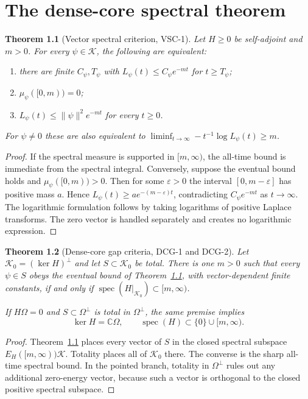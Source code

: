 \documentclass[11pt,oneside]{report}
\newtheorem{theorem}{Theorem}[chapter]
\theoremstyle{definition}
\theoremstyle{remark}
\newcommand{\spec}{\operatorname{spec}}
\begin{document}
\chapter{The dense-core spectral theorem}

\begin{theorem}[Vector spectral criterion, VSC-1]\label{thm:vsc}
Let $H\geq0$ be self-adjoint and $m>0$. For every $\psi\in\mathcal K$,
the following are equivalent:
\begin{enumerate}
\item there are finite $C_\psi,T_\psi$ with
$L_\psi(t)\leq C_\psi e^{-mt}$ for $t\geq T_\psi$;
\item $\mu_\psi([0,m))=0$;
\item $L_\psi(t)\leq\|\psi\|^2e^{-mt}$ for every $t\geq0$.
\end{enumerate}
For $\psi\neq0$ these are also equivalent to
$\liminf_{t\to\infty}-t^{-1}\log L_\psi(t)\geq m$.
\end{theorem}
\begin{proof}
If the spectral measure is supported in $[m,\infty)$, the all-time bound is
immediate from the spectral integral. Conversely, suppose the eventual bound
holds and $\mu_\psi([0,m))>0$. Then for some $\varepsilon>0$ the interval
$[0,m-\varepsilon]$ has positive mass $a$. Hence
$L_\psi(t)\geq a e^{-(m-\varepsilon)t}$, contradicting
$C_\psi e^{-mt}$ as $t\to\infty$. The logarithmic formulation follows by
taking logarithms of positive Laplace transforms. The zero vector is handled
separately and creates no logarithmic expression.
\end{proof}

\begin{theorem}[Dense-core gap criteria, DCG-1 and DCG-2]\label{thm:dcg}
Let $\mathcal K_0=(\ker H)^\perp$ and let $S\subset\mathcal K_0$ be total.
There is one $m>0$ such that every $\psi\in S$ obeys the eventual bound of
Theorem~\ref{thm:vsc}, with vector-dependent finite constants, if and only if
$\spec(H|_{\mathcal K_0})\subset[m,\infty)$.

If $H\Omega=0$ and $S\subset\Omega^\perp$ is total in $\Omega^\perp$, the
same premise implies
\[
 \ker H=\mathbb C\Omega,\qquad
 \spec(H)\subset\{0\}\cup[m,\infty).
\]
\end{theorem}
\begin{proof}
Theorem~\ref{thm:vsc} places every vector of $S$ in the closed spectral
subspace $E_H([m,\infty))\mathcal K$. Totality places all of $\mathcal K_0$
there. The converse is the sharp all-time spectral bound. In the pointed
branch, totality in $\Omega^\perp$ rules out any additional zero-energy vector,
because such a vector is orthogonal to the closed positive spectral subspace.
\end{proof}
\end{document}
